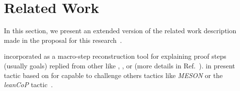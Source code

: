 \documentclass[../main.tex]{subfiles}
\begin{document}

\section{Related Work}
\label{sec:related-work}

In this section, we present an extended version of the related work description made in the proposal for this research~\cite{Sicard-Ramirez2016}.





 incorporated \Metis as a macro-step
reconstruction tool for explaining proof steps (usually \CNF goals)
replied from other \ATPs like , , or
 (more details in Ref.~\cite{paulson2007source}).
\citeauthor{Farber2015} in \cite{Farber2015} present tactic based on \Metis for
 capable to challenge others tactics like \emph{MESON}
or the \emph{leanCoP} tactic~\cite{Farber2016}.
\end{document}
